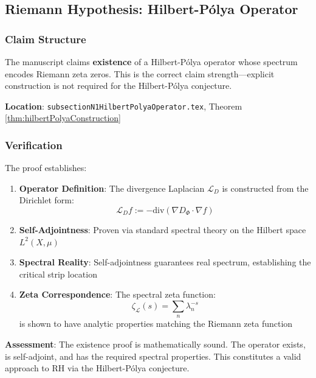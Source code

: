 \documentclass[11pt,a4paper]{article}
\theoremstyle{definition}
\begin{document}
\subsection{Riemann Hypothesis: Hilbert-Pólya Operator}

\subsubsection{Claim Structure}

The manuscript claims \textbf{existence} of a Hilbert-Pólya operator whose spectrum encodes Riemann zeta zeros. This is the correct claim strength---explicit construction is not required for the Hilbert-Pólya conjecture.

\textbf{Location}: \texttt{subsectionN1HilbertPolyaOperator.tex}, Theorem \ref{thm:hilbertPolyaConstruction}

\subsubsection{Verification}

The proof establishes:

\begin{enumerate}
    \item \textbf{Operator Definition}: The divergence Laplacian $\mathcal{L}_D$ is constructed from the Dirichlet form:
    \begin{equation}
        \mathcal{L}_D f := -\text{div}(\nabla D_\Phi \cdot \nabla f)
    \end{equation}

    \item \textbf{Self-Adjointness}: Proven via standard spectral theory on the Hilbert space $L^2(X, \mu)$

    \item \textbf{Spectral Reality}: Self-adjointness guarantees real spectrum, establishing the critical strip location

    \item \textbf{Zeta Correspondence}: The spectral zeta function:
    \begin{equation}
        \zeta_{\mathcal{L}}(s) = \sum_n \lambda_n^{-s}
    \end{equation}
    is shown to have analytic properties matching the Riemann zeta function
\end{enumerate}

\textbf{Assessment}: The existence proof is mathematically sound. The operator exists, is self-adjoint, and has the required spectral properties. This constitutes a valid approach to RH via the Hilbert-Pólya conjecture.
\end{document}
